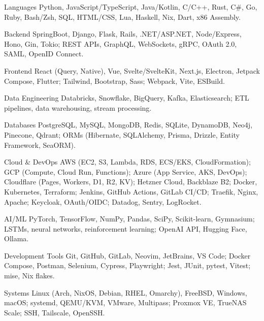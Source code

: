 \documentclass[11pt, letterpaper]{awesome-cv}
\begin{document}
\begin{cvskills}

  \cvskill
    {Languages}
    {Python, JavaScript/TypeScript, Java/Kotlin, C/C++, Rust, C\#, Go, Ruby, Bash/Zsh, SQL, HTML/CSS, Lua, Haskell, Nix, Dart, x86 Assembly.}

  \cvskill
    {Backend}
    {SpringBoot, Django, Flask, Rails, .NET/ASP.NET, Node/Express, Hono, Gin, Tokio; REST APIs, GraphQL, WebSockets, gRPC, OAuth 2.0, SAML, OpenID Connect.}

  \cvskill
    {Frontend}
    {React (Query, Native), Vue, Svelte/SvelteKit, Next.js, Electron, Jetpack Compose, Flutter; Tailwind, Bootstrap, Sass; Webpack, Vite, ESBuild.}

  \cvskill
    {Data Engineering}
    {Databricks, Snowflake, BigQuery, Kafka, Elasticsearch; ETL pipelines, data warehousing, stream processing.}

  \cvskill
    {Databases}
    {PostgreSQL, MySQL, MongoDB, Redis, SQLite, DynamoDB, Neo4j, Pinecone, Qdrant; ORMs (Hibernate, SQLAlchemy, Prisma, Drizzle, Entity Framework, SeaORM).}

  \cvskill
    {Cloud \& DevOps}
    {AWS (EC2, S3, Lambda, RDS, ECS/EKS, CloudFormation); GCP (Compute, Cloud Run, Functions); Azure (App Service, AKS, DevOps); Cloudflare (Pages, Workers, D1, R2, KV); Hetzner Cloud, Backblaze B2; Docker, Kubernetes, Terraform; Jenkins, GitHub Actions, GitLab CI/CD; Traefik, Nginx, Apache; Keycloak, OAuth/OIDC; Datadog, Sentry, LogRocket.}

  \cvskill
    {AI/ML}
    {PyTorch, TensorFlow, NumPy, Pandas, SciPy, Scikit-learn, Gymnasium; LSTMs, neural networks, reinforcement learning; OpenAI API, Hugging Face, Ollama.}

  \cvskill
    {Development Tools}
    {Git, GitHub, GitLab, Neovim, JetBrains, VS Code; Docker Compose, Postman, Selenium, Cypress, Playwright; Jest, JUnit, pytest, Vitest; mise, Nix flakes.}

  \cvskill
    {Systems}
    {Linux (Arch, NixOS, Debian, RHEL, Omarchy), FreeBSD, Windows, macOS; systemd, QEMU/KVM, VMware, Multipass; Proxmox VE, TrueNAS Scale; SSH, Tailscale, OpenSSH.}

\end{cvskills}

\end{document}
